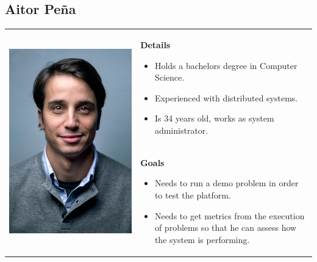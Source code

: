 \subsection*{Aitor Peña}
\begin{table}[H]
\begin{tabular}{c p{}}
\multirow{2}{*}{
      \includegraphics[width=0.3\linewidth]{assets/images/man1.png}
} 
& 
\multicolumn{1}{p{0.7\textwidth}}{
\textbf{Details}
\begin{itemize}
	\item Holds a bachelors degree in Computer Science.
	\item Experienced with distributed systems.
	\item Is 34 years old, works as system administrator.
\end{itemize}
} \\
&
\textbf{Goals} 
\begin{itemize}
	\item Needs to run a demo problem in order to test the platform.
	\item Needs to get metrics from the execution of problems so that he can assess how the system is performing.
\end{itemize}   
\end{tabular}
\end{table}

